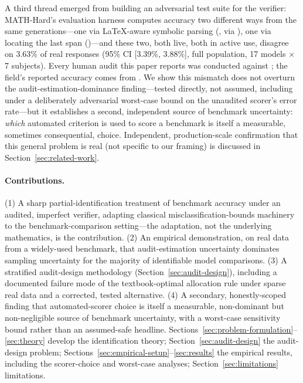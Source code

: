 A third thread emerged from building an adversarial test suite for the
verifier: MATH-Hard's evaluation harness computes accuracy two different ways
from the same generations---one via LaTeX-aware symbolic parsing
(\exactmatch, via ), one via locating the last
 span (\scoreboxed)---and these two, both
live, both in active use, disagree on 3.63\% of real responses (95\% CI
[3.39\%, 3.88\%], full population, 17 models $\times$ 7 subjects). Every
human audit this paper reports was conducted against \scoreboxed; the field's
reported accuracy comes from \exactmatch. We show this mismatch does not
overturn the audit-estimation-dominance finding---tested directly, not
assumed, including under a deliberately adversarial worst-case bound on the
unaudited scorer's error rate---but it establishes a second, independent
source of benchmark uncertainty: \emph{which} automated criterion is used to
score a benchmark is itself a measurable, sometimes consequential, choice.
Independent, production-scale confirmation that this general problem is real
(not specific to our framing) is discussed in Section~\ref{sec:related-work}.

\paragraph{Contributions.} (1) A sharp partial-identification treatment of
benchmark accuracy under an audited, imperfect verifier, adapting classical
misclassification-bounds machinery
\citep{manski1995identification,molinari2008partial} to the
benchmark-comparison setting---the adaptation, not the underlying
mathematics, is the contribution. (2) An empirical demonstration, on real
data from a widely-used benchmark, that audit-estimation uncertainty
dominates sampling uncertainty for the majority of identifiable model
comparisons. (3) A stratified audit-design methodology
(Section~\ref{sec:audit-design}), including a documented failure mode of the
textbook-optimal allocation rule under sparse real data and a corrected,
tested alternative. (4) A secondary, honestly-scoped finding that
automated-scorer choice is itself a measurable, non-dominant but
non-negligible source of benchmark uncertainty, with a worst-case sensitivity
bound rather than an assumed-safe headline. Sections~\ref{sec:problem-formulation}--\ref{sec:theory}
develop the identification theory; Section~\ref{sec:audit-design} the
audit-design problem; Sections~\ref{sec:empirical-setup}--\ref{sec:results}
the empirical results, including the scorer-choice and worst-case analyses;
Section~\ref{sec:limitations} limitations.
